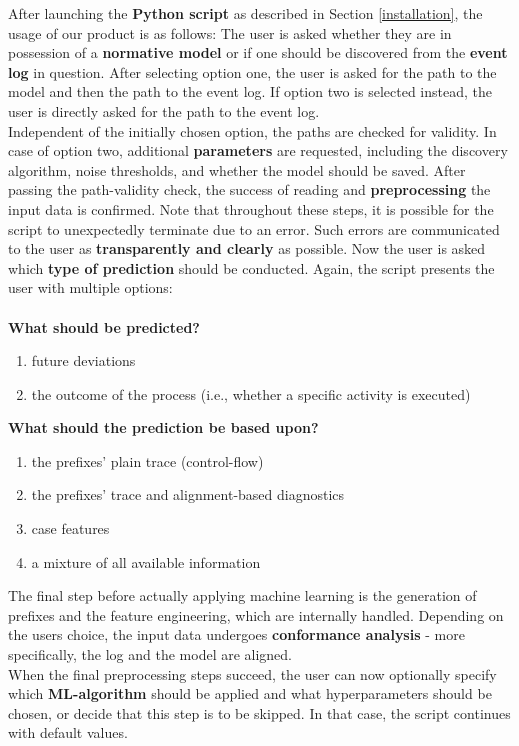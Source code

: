 \documentclass[12pt,a4paper]{article}
\begin{document}
After launching the \textbf{Python script} as described in Section \ref{installation}, the usage of our product is as follows:
The user is asked whether they are in possession of a \textbf{normative model} or if one should be discovered from the \textbf{event log} in question. 
After selecting option one, the user is asked for the path to the model and then the path to the event log.
If option two is selected instead, the user is directly asked for the path to the event log.\\
Independent of the initially chosen option, the paths are checked for validity. In case of option two, additional \textbf{parameters} are requested, including the discovery algorithm, noise thresholds, and whether the model should be saved.
After passing the path-validity check, the success of reading and \textbf{preprocessing} the input data is confirmed.  
Note that throughout these steps, it is possible for the script to unexpectedly terminate due to an error. Such errors are communicated to the user as \textbf{transparently and clearly} as possible. 
Now the user is asked which \textbf{type of prediction} should be conducted. Again, the script presents the user with multiple options: \\\\
\textbf{What should be predicted?}
\begin{enumerate}
    \item future deviations
    \item the outcome of the process (i.e., whether a specific activity is executed)
\end{enumerate}
\textbf{What should the prediction be based upon?}
\begin{enumerate}
    \item the prefixes' plain trace (control-flow)
    \item the prefixes' trace and alignment-based diagnostics
    \item case features
    \item a mixture of all available information
\end{enumerate}
The final step before actually applying machine learning is the generation of prefixes and the feature engineering, which are internally handled. Depending on the users choice, the input data undergoes \textbf{conformance analysis} - more specifically, the log and the model are aligned.\\
When the final preprocessing steps succeed, the user can now optionally specify which \textbf{ML-algorithm} should be applied and what hyperparameters should be chosen, or decide that this step is to be skipped. In that case, the script continues with default values.
\end{document}
